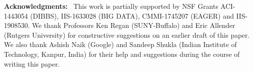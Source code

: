 \documentclass{svproc}
\begin{document}
















\vspace*{.2in}

\noindent
{\bf Acknowledgments:}~
This work is partially supported by
NSF Grants  ACI-1443054 (DIBBS),
IIS-1633028 (BIG DATA), 
CMMI-1745207 (EAGER) and IIS-1908530.
We thank Professors Ken Regan (SUNY-Buffalo) and Eric Allender (Rutgers University)
for constructive suggestions on an earlier draft of this paper.
We also thank Ashish Naik (Google) and 
Sandeep Shukla (Indian Institute of Technology, Kanpur, India) 
for their help and suggestions during the course of writing this paper.

\clearpage



\clearpage

\setcounter{page}{0}
\thispagestyle{empty}


\end{document}
